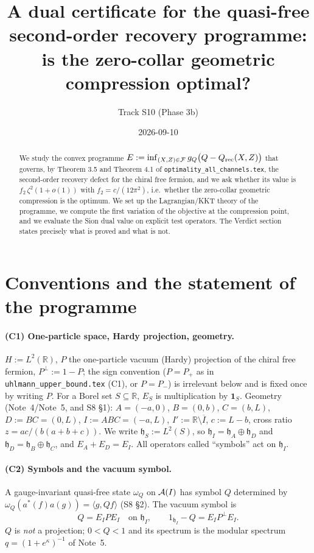 \documentclass[11pt]{article}
\title{A dual certificate for the quasi-free second-order recovery programme:\\
is the zero-collar geometric compression optimal?}
\author{Track S10 (Phase 3b)}
\date{2026-09-10}
\begin{document}
\maketitle

\begin{abstract}
We study the convex programme
$E := \inf_{(X,Z)\in\mathcal F} g_Q\bigl(Q-Q_{\rm rec}(X,Z)\bigr)$
that governs, by Theorem 3.5 and Theorem 4.1 of \texttt{optimality\_all\_channels.tex},
the second-order recovery defect for the chiral free fermion, and we ask whether its
value is $f_2\,\zeta^2(1+o(1))$ with $f_2=c/(12\pi^2)$, i.e.\ whether the zero-collar
geometric compression is the optimum. We set up the Lagrangian/KKT theory of the
programme, we compute the first variation of the objective at the compression point,
and we evaluate the Sion dual value on explicit test operators.
The Verdict section states precisely what is proved and what is not.
\end{abstract}

\tableofcontents

\section{Conventions and the statement of the programme}\label{sec:conv}

\paragraph{(C1) One-particle space, Hardy projection, geometry.}
$H:=L^2(\mathbb R)$, $P$ the one-particle vacuum (Hardy) projection of the chiral free
fermion, $P^\perp:=1-P$; the sign convention ($P=P_+$ as in
\texttt{uhlmann\_upper\_bound.tex} (C1), or $P=P_-$) is irrelevant below and is fixed
once by writing $P$.  For a Borel set $S\subseteq\mathbb R$, $E_S$ is multiplication by
$\mathbf 1_S$.  Geometry (Note~4/Note~5, and S8 \S1): $A=(-a,0)$, $B=(0,b)$, $C=(b,L)$,
$D:=BC=(0,L)$, $I:=ABC=(-a,L)$, $I':=\mathbb R\setminus\overline I$, $c:=L-b$,
cross ratio $z=ac/(b(a+b+c))$.  We write $\mathfrak h_S:=L^2(S)$, so
$\mathfrak h_I=\mathfrak h_A\oplus\mathfrak h_D$ and $\mathfrak h_D=\mathfrak h_B\oplus\mathfrak h_C$,
and $E_A+E_D=E_I$.  All operators called ``symbols'' act on $\mathfrak h_I$.

\paragraph{(C2) Symbols and the vacuum symbol.}
A gauge-invariant quasi-free state $\omega_Q$ on $\mathcal A(I)$ has symbol $Q$ determined by
$\omega_Q(a^*(f)a(g))=\langle g,Qf\rangle$ (S8 \S2).  The vacuum symbol is
\begin{equation}\label{eq:Qvac}
 Q=E_IPE_I\quad\text{on }\mathfrak h_I,\qquad 1_{\mathfrak h_I}-Q=E_IP^\perp E_I .
\end{equation}
$Q$ is \emph{not} a projection; $0<Q<1$ and its spectrum is the modular spectrum
$q=(1+e^{\kappa})^{-1}$ of Note~5.
\end{document}
